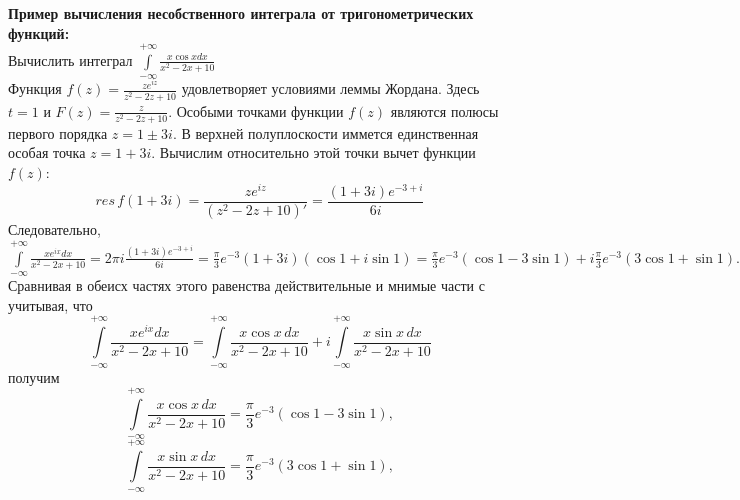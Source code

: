 \newpage
\textbf{Пример вычисления несобственного интеграла от тригонометрических функций:}\\
Вычислить интеграл $\int\limits_{-\infty}^{+\infty} \frac{x\cos x dx}{x^2-2x+10}$\\
Функция $f(z)=\frac{ze^{iz}}{z^2-2z+10}$ удовлетворяет условиями леммы Жордана. Здесь $t=1$ и $F(z)=\frac{z}{z^2-2z+10}$. Особыми точками функции $f(z)$ являются полюсы первого порядка $z=1\pm 3i$. В верхней полуплоскости иммется единственная особая точка $z=1+3i$. Вычислим относительно этой точки вычет функции $f(z)$:
$$res\, f(1+3i) = \frac{ze^{iz}}{(z^2-2z+10)'}=\frac{(1+3i)e^{-3+i}}{6i}$$
Следовательно, $\int\limits_{-\infty}^{+\infty} \frac{xe^{ix}dx}{x^2-2x+10}=2\pi i \frac{(1+3i)e^{-3+i}}{6i} = \frac{\pi}{3}e^{-3}(1+3i)(\cos 1+i\sin 1)=\frac{\pi}{3} e^{-3}(\cos 1 - 3\sin 1)+i\frac{\pi}{3}e^{-3}(3\cos 1+\sin 1).$\\
Сравнивая в обеисх частях этого равенства действительные и мнимые части с учитывая, что $$\int\limits_{-\infty}^{+\infty}\frac{xe^{ix}dx}{x^2-2x+10}=\int\limits_{-\infty}^{+\infty}\frac{x\cos x\, dx}{x^2-2x+10}+i\int\limits_{-\infty}^{+\infty}\frac{x\sin x\, dx}{x^2-2x+10}$$ 
получим $$\int\limits_{-\infty}^{+\infty}\frac{x\cos x\, dx}{x^2-2x+10} = \frac{\pi}{3}e^{-3}(\cos 1-3\sin 1),$$
$$\int\limits_{-\infty}^{+\infty}\frac{x\sin x\, dx}{x^2-2x+10} = \frac{\pi}{3}e^{-3}(3\cos 1+\sin 1),$$
